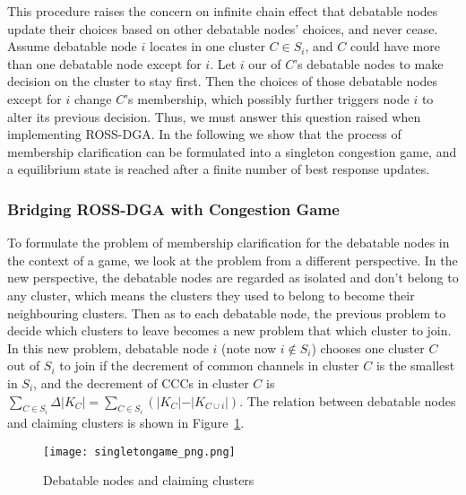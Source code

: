 This procedure raises the concern on infinite chain effect that debatable nodes update their choices based on other debatable nodes' choices, and never cease.
Assume debatable node $i$ locates in one cluster $C\in S_i$, and $C$ could have more than one debatable node except for $i$.
Let $i$ our of $C$'s debatable nodes to make decision on the cluster to stay first.
Then the choices of those debatable nodes except for $i$ change $C$'s membership, which possibly further triggers node $i$ to alter its previous decision.
Thus, we must answer this question raised when implementing ROSS-DGA.
In the following we show that the process of membership clarification can be formulated into a singleton congestion game, and a equilibrium state is reached after a finite number of best response updates.

\subsubsection{Bridging ROSS-DGA with Congestion Game}
To formulate the problem of membership clarification for the debatable nodes in the context of a game, we look at the problem from a different perspective. 
In the new perspective, the debatable nodes are regarded as isolated and don't belong to any cluster, which means the clusters they used to belong to become their neighbouring clusters. 
Then as to each debatable node, the previous problem to decide which clusters to leave becomes a new problem that which cluster to join.
In this new problem, debatable node $i$ (note now $i\notin S_i$) chooses one cluster $C$ out of $S_i$ to join if the decrement of common channels in cluster $C$ is the  %
smallest in $S_i$, and the decrement of CCCs in cluster $C$ is $\sum_{C\in S_i}\Delta\vert K_C \vert=\sum_{C\in S_i}({\vert K_{C} \vert-\vert K_{C\cup i} \vert})$. %
The relation between debatable nodes and claiming clusters is shown in Figure~\ref{debatable_nodes_claiming_cluster}.
\begin{figure}[ht!]
  \centering
  \texttt{[image: singletongame\_png.png]}
  \caption{Debatable nodes and claiming clusters}
  \label{debatable_nodes_claiming_cluster}
\end{figure}

